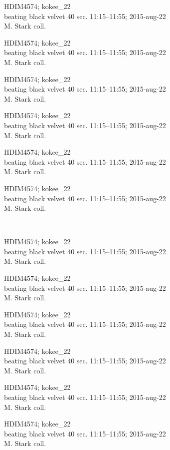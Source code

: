 \documentclass[2pt]{extarticle}
\begin{document}
\noindent
\parbox{0.16\textwidth}{\tiny \raggedright \rule[-0.3\baselineskip]{0pt}{10pt}HDIM4574; kokee\_22\\ beating black velvet 40 sec. 11:15--11:55; 2015-aug-22\\ M. Stark coll.}
\parbox{0.16\textwidth}{\tiny \raggedright \rule[-0.3\baselineskip]{0pt}{10pt}HDIM4574; kokee\_22\\ beating black velvet 40 sec. 11:15--11:55; 2015-aug-22\\ M. Stark coll.}
\parbox{0.16\textwidth}{\tiny \raggedright \rule[-0.3\baselineskip]{0pt}{10pt}HDIM4574; kokee\_22\\ beating black velvet 40 sec. 11:15--11:55; 2015-aug-22\\ M. Stark coll.}
\parbox{0.16\textwidth}{\tiny \raggedright \rule[-0.3\baselineskip]{0pt}{10pt}HDIM4574; kokee\_22\\ beating black velvet 40 sec. 11:15--11:55; 2015-aug-22\\ M. Stark coll.}
\parbox{0.16\textwidth}{\tiny \raggedright \rule[-0.3\baselineskip]{0pt}{10pt}HDIM4574; kokee\_22\\ beating black velvet 40 sec. 11:15--11:55; 2015-aug-22\\ M. Stark coll.}
\parbox{0.16\textwidth}{\tiny \raggedright \rule[-0.3\baselineskip]{0pt}{10pt}HDIM4574; kokee\_22\\ beating black velvet 40 sec. 11:15--11:55; 2015-aug-22\\ M. Stark coll.} \\ 
\vspace{0.001in} 

\noindent
\parbox{0.16\textwidth}{\tiny \raggedright \rule[-0.3\baselineskip]{0pt}{10pt}HDIM4574; kokee\_22\\ beating black velvet 40 sec. 11:15--11:55; 2015-aug-22\\ M. Stark coll.}
\parbox{0.16\textwidth}{\tiny \raggedright \rule[-0.3\baselineskip]{0pt}{10pt}HDIM4574; kokee\_22\\ beating black velvet 40 sec. 11:15--11:55; 2015-aug-22\\ M. Stark coll.}
\parbox{0.16\textwidth}{\tiny \raggedright \rule[-0.3\baselineskip]{0pt}{10pt}HDIM4574; kokee\_22\\ beating black velvet 40 sec. 11:15--11:55; 2015-aug-22\\ M. Stark coll.}
\parbox{0.16\textwidth}{\tiny \raggedright \rule[-0.3\baselineskip]{0pt}{10pt}HDIM4574; kokee\_22\\ beating black velvet 40 sec. 11:15--11:55; 2015-aug-22\\ M. Stark coll.}
\parbox{0.16\textwidth}{\tiny \raggedright \rule[-0.3\baselineskip]{0pt}{10pt}HDIM4574; kokee\_22\\ beating black velvet 40 sec. 11:15--11:55; 2015-aug-22\\ M. Stark coll.}
\parbox{0.16\textwidth}{\tiny \raggedright \rule[-0.3\baselineskip]{0pt}{10pt}HDIM4574; kokee\_22\\ beating black velvet 40 sec. 11:15--11:55; 2015-aug-22\\ M. Stark coll.} \\ 
\vspace{0.001in} 
\end{document}
